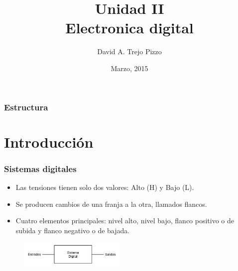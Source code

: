 \documentclass{beamer}
\title[Seminario de tecnologia]{Unidad II\\ Electronica digital}
\author{David A. Trejo Pizzo}
\institute[Instituto Multimedial Da Vinci]
{Departamento de sistemas\\
\medskip
\textit{dtrejopizzo@gmail.com}}
\date{Marzo, 2015}
\begin{document}
\begin{frame}
\titlepage
\end{frame}


\begin{frame}
\frametitle{Estructura}
\tableofcontents
\end{frame}




\section{Introducción}

\begin{frame}
\frametitle{Sistemas digitales}

\begin{itemize}
\item Las tensiones tienen solo dos valores: Alto (H) y Bajo (L).
\item Se producen cambios de una franja a la otra, llamados flancos.
\item Cuatro elementos principales: nivel alto, nivel bajo, flanco positivo o de subida y flanco negativo o de bajada.
\end{itemize}

\begin{figure}[!h]
\centering
\includegraphics[width=2in]{sistemad}
\end{figure}

\end{frame}
\end{document}
